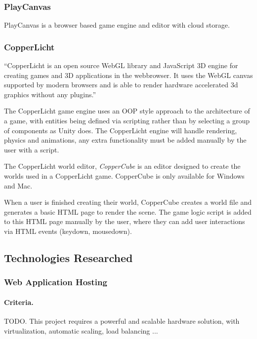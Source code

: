 \documentclass[a4paper, 12pt]{article}
\begin{document}
\subsubsection{PlayCanvas}
PlayCanvas is a browser based game engine and editor with cloud storage. 


\subsubsection{CopperLicht}
``CopperLicht is an open source WebGL library and JavaScript 3D engine for creating games and 3D applications in the webbrowser. It uses the WebGL canvas supported by modern browsers and is able to render hardware accelerated 3d graphics without any plugins.''


The CopperLicht game engine uses an OOP style approach to the architecture of a game, with entities being defined via scripting rather than by selecting a group of components as Unity does. The CopperLicht engine will handle rendering, physics and animations, any extra functionality must be added manually by the user with a script.


The CopperLicht world editor, \emph{CopperCube} is an editor designed to create the worlds used in a CopperLicht game. CopperCube is only available for Windows and Mac.


When a user is finished creating their world, CopperCube creates a world file and generates a basic HTML page to render the scene. The game logic script is added to this HTML page manually by the user, where they can add user interactions via HTML events (keydown, mousedown).


\subsection{Technologies Researched}
\subsubsection{Web Application Hosting}
\paragraph{Criteria.}
TODO. This project requires a powerful and scalable hardware solution, with virtualization, automatic scaling, load balancing ...
\end{document}
